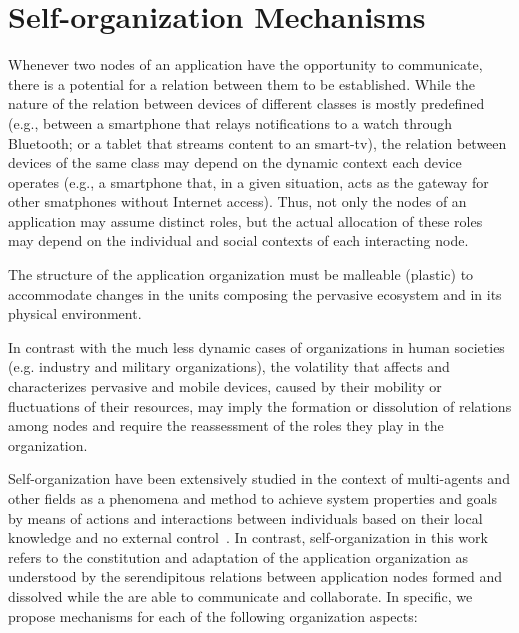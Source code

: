 \section{Self-organization Mechanisms}\label{sec:self_organization}
Whenever two nodes of an application have the opportunity to communicate, there is a potential for a relation between them to be established. 
While the nature of the relation between devices of different classes is mostly predefined (e.g., between a smartphone that relays notifications to a watch through Bluetooth; or a tablet that streams content to an smart-tv), the relation between devices of the same class may depend on the dynamic context each device operates (e.g., a smartphone that, in a given situation, acts as the gateway for other smatphones without Internet access). Thus, not only the nodes of an application may assume distinct roles, but the actual allocation of these roles may depend on the individual and social contexts of each interacting node.

The structure of the application organization
must be malleable (plastic) to accommodate changes in the units composing the pervasive ecosystem and in its physical environment. 

In contrast with the much less dynamic cases of organizations in human societies (e.g. industry and military organizations), the volatility that affects and characterizes pervasive and mobile devices, caused by their mobility or fluctuations of their resources, may imply the formation or dissolution of relations among nodes and require the reassessment of the roles they play in the organization.

Self-organization have been extensively studied in the context of multi-agents and other fields as a phenomena and method to achieve system properties and goals by means of actions and interactions between individuals based on their local knowledge and no external control~\cite{DiMarzoSerugendo:2005, Banzhaf:2009}. In contrast, self-organization in this work refers to the constitution and adaptation of the application organization as understood by the serendipitous relations between application nodes formed and dissolved while the are able to communicate and collaborate. In specific, we propose mechanisms for each of the following organization aspects:

